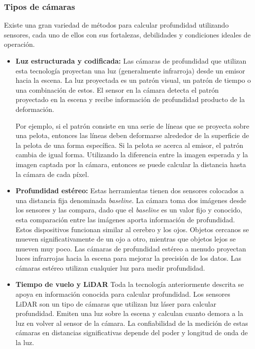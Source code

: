 \subsubsection{Tipos de cámaras}

Existe una gran variedad de métodos para calcular profundidad utilizando sensores, cada uno de ellos con sus fortalezas, debilidades y condiciones ideales de operación. 

\begin{itemize}
	\item \textbf{Luz estructurada y codificada:} Las cámaras de profundidad que utilizan esta tecnología proyectan una luz (generalmente infrarroja) desde un emisor hacia la escena. La luz proyectada es un patrón visual, un patrón de tiempo o una combinación de estos. El sensor en la cámara detecta el patrón proyectado en la escena y recibe información de profundidad producto de la deformación. 
	
	Por ejemplo, si el patrón consiste en una serie de líneas que se proyecta sobre una pelota, entonces las líneas deben deformarse alrededor de la superficie de la pelota de una forma específica. Si la pelota se acerca al emisor, el patrón cambia de igual forma. Utilizando la diferencia entre la imagen esperada y la imagen captada por la cámara, entonces se puede calcular la distancia hasta la cámara de cada píxel.
	
	\item \textbf{Profundidad estéreo:} Estas herramientas tienen dos sensores colocados a una distancia fija denominada \textit{baseline}. La cámara toma dos imágenes desde los sensores y las compara, dado que el \textit{baseline} es un valor fijo y conocido, esta comparación entre las imágenes aporta información de profundidad. Estos dispositivos funcionan similar al cerebro y los ojos. Objetos cercanos se mueven significativamente de un ojo a otro, mientras que objetos lejos se mueven muy poco. Las cámaras de profundidad estéreo a menudo proyectan luces infrarrojas hacia la escena para mejorar la precisión de los datos. Las cámaras estéreo utilizan cualquier luz para medir profundidad. 
	
	\item \textbf{Tiempo de vuelo y LiDAR} Toda la tecnología anteriormente descrita se apoya en información conocida para calcular profundidad. Los sensores LiDAR son un tipo de cámaras que utilizan luz láser para calcular profundidad. Emiten una luz sobre la escena y calculan cuanto demora a la luz en volver al sensor de la cámara. La confiabilidad de la medición de estas cámaras en distancias significativas depende del poder y longitud de onda de la luz.
\end{itemize}

